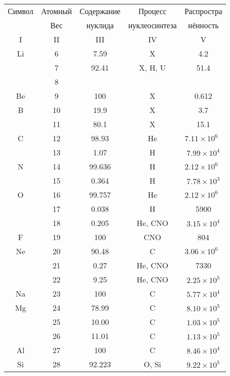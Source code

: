 \documentclass[a5paper,openany]{book}
\begin{document}
~\\
~\\
~\\


\begin{table}[h!]
	{\footnotesize 
		\begin{tabular}{ccccc}
			Символ  & Атомный &  Содержание  & Процесс & Распростра   \\
			~ & Вес &  нуклида  &  нуклеосинтеза  & нённость  \\
			\hline 
			I & II &  III  & IV & V \\
			\hline 
			Li & 6 & 7.59 & X &  4.2 \\ [1mm]
			 & 7 & 92.41 & X, H, U & 51.4\\ [1mm]
			  			 & 8 & &  & \\ [1mm]
			 Be & 9 & 100 & X  &  0.612 \\ [1mm]
			B & 10 & 19.9 & X &  3.7 \\ [1mm]
			 & 11 & 80.1 & X & 15.1\\ [1mm]
 			\hline 			
 			C & 12 & 98.93 & He &  $7.11 \times 10^{6}$\ \\ [1mm]
			 & 13 & 1.07 & H & $7.99 \times 10^{4}$ \\ [1mm]
			N & 14 & 99.636 & H &  $2.12 \times 10^{6}$\ \\ [1mm]
			& 15 & 0.364 & H & $7.78 \times 10^{3}$ \\ [1mm] 
			O & 16 & 99.757 & He &  $2.12 \times 10^{6}$\ \\ [1mm]
			  & 17 & 0.038 & H & 5900 \\ [1mm] 			
			  & 18 & 0.205 & He, CNO & $3.15 \times 10^{4}$ \\ [1mm] 
			F & 19 & 100 & CNO &  804 \\ [1mm] 
			Ne & 20 & 90.48 & C &  $3.06 \times 10^{6}$\ \\ [1mm]
			& 21 & 0.27 & He, CNO & 7330 \\ [1mm] 			
			& 22 & 9.25 & He, CNO & $2.25 \times 10^{5}$ \\ [1mm] 
			Na & 23 & 100 & C &   $5.77 \times 10^{4}$ \\ [1mm] 
			Mg & 24 & 78.99 & C &  $8.10 \times 10^{5}$ \\ [1mm]
			& 25 & 10.00 & C & $1.03 \times 10^{5}$ \\ [1mm] 			
			& 26 & 11.01 & C & $1.13 \times 10^{5}$ \\ [1mm] 
			Al & 27 & 100 & C &   $8.46 \times 10^{4}$ \\ [1mm] 
			Si & 28 & 92.223 & O, Si &  $9.22 \times 10^{5}$ \\ [1mm]

\end{tabular}}
\end{table}
\end{document}
